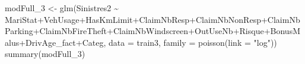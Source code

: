 \documentclass[
]{article}
\newenvironment{Shaded}{\begin{snugshade}}{\end{snugshade}}
\newcommand{\AttributeTok}[1]{\textcolor[rgb]{0.77,0.63,0.00}{#1}}
\newcommand{\FunctionTok}[1]{\textcolor[rgb]{0.00,0.00,0.00}{#1}}
\newcommand{\NormalTok}[1]{#1}
\newcommand{\OtherTok}[1]{\textcolor[rgb]{0.56,0.35,0.01}{#1}}
\newcommand{\SpecialCharTok}[1]{\textcolor[rgb]{0.00,0.00,0.00}{#1}}
\newcommand{\StringTok}[1]{\textcolor[rgb]{0.31,0.60,0.02}{#1}}
\begin{document}
\begin{Shaded}
\begin{Highlighting}[]
\NormalTok{modFull\_3 }\OtherTok{\textless{}{-}} \FunctionTok{glm}\NormalTok{(Sinistres2 }\SpecialCharTok{\textasciitilde{}}\NormalTok{ MariStat}\SpecialCharTok{+}\NormalTok{VehUsage}\SpecialCharTok{+}\NormalTok{HasKmLimit}\SpecialCharTok{+}\NormalTok{ClaimNbResp}\SpecialCharTok{+}\NormalTok{ClaimNbNonResp}\SpecialCharTok{+}\NormalTok{ClaimNbParking}\SpecialCharTok{+}\NormalTok{ClaimNbFireTheft}\SpecialCharTok{+}\NormalTok{ClaimNbWindscreen}\SpecialCharTok{+}\NormalTok{OutUseNb}\SpecialCharTok{+}\NormalTok{Risque}\SpecialCharTok{+}\NormalTok{BonusMalus}\SpecialCharTok{+}\NormalTok{DrivAge\_fact}\SpecialCharTok{+}\NormalTok{Categ, }\AttributeTok{data =}\NormalTok{ train3, }\AttributeTok{family =} \FunctionTok{poisson}\NormalTok{(}\AttributeTok{link =} \StringTok{"log"}\NormalTok{))}
\FunctionTok{summary}\NormalTok{(modFull\_3)}
\end{Highlighting}
\end{Shaded}
\end{document}
